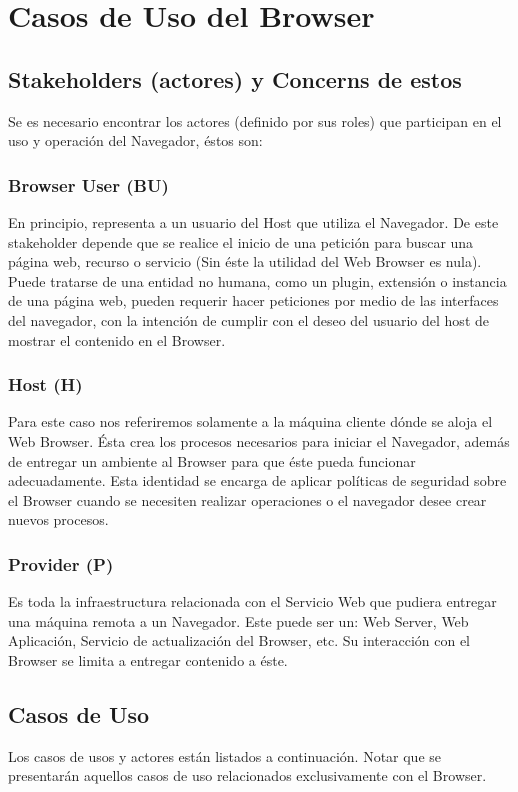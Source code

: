 \section{Casos de Uso del Browser}
	\subsection{Stakeholders (actores) y Concerns de estos}
	Se es necesario encontrar los actores (definido por sus roles) que participan en el uso y operación del Navegador, éstos son:
		\subsubsection{Browser User (BU)}
		En principio, representa a un usuario del Host que utiliza el Navegador. De este stakeholder depende que se realice el inicio de una petición para buscar una página web, recurso o servicio (Sin éste la utilidad del Web Browser es nula). Puede tratarse de una entidad no humana, como un plugin, extensión o instancia de una página web, pueden requerir hacer peticiones por medio de las interfaces del navegador, con la intención de cumplir con el deseo del usuario del host de mostrar el contenido en el Browser.
		\subsubsection{Host (H)}
		Para este caso nos referiremos solamente a la máquina cliente dónde se aloja el Web Browser. Ésta crea los procesos necesarios para iniciar el Navegador, además de entregar un ambiente al Browser para que éste pueda funcionar adecuadamente.  Esta identidad se encarga de aplicar políticas de seguridad sobre el Browser cuando se necesiten realizar operaciones o el navegador desee crear nuevos procesos.
		\subsubsection{Provider (P)}
		Es toda la infraestructura relacionada con el Servicio Web que pudiera entregar una máquina remota a un Navegador. Este puede ser un: Web Server, Web Aplicación, Servicio de actualización del Browser, etc. Su interacción con el Browser se limita a entregar contenido a éste.
		\subsection{Casos de Uso}
Los casos de usos y actores están listados a continuación. Notar que se presentarán aquellos casos de uso relacionados exclusivamente con el Browser.

